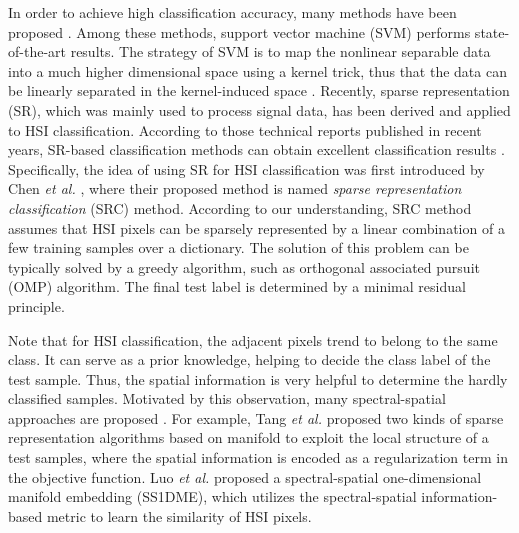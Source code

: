 \documentclass{ws-ijwmip}
\begin{document}
In order to achieve high classification accuracy, many methods have been proposed \cite{6}. 
Among these methods, support vector machine (SVM) performs state-of-the-art results. 
The strategy of SVM is to map the nonlinear separable data into a much higher dimensional space using a kernel trick, thus that the data can be linearly separated in the kernel-induced space \cite{7,8,9}.
Recently, sparse representation (SR), which was mainly used to process signal data, has been derived and applied to  
HSI classification. 
According to those technical reports published in recent years, SR-based classification methods can obtain excellent classification results \cite{13,14,15,16,17}.
Specifically, the idea of using SR for HSI classification was first introduced by Chen {\it et al.} \cite{18}, where their proposed method is named \emph{sparse representation classification} (SRC) method.
According to our understanding, SRC method assumes that HSI pixels can be sparsely represented by a linear combination of a few training samples over a dictionary. 
The solution of this problem can be typically solved by a greedy algorithm, such as orthogonal associated pursuit (OMP) algorithm. 
The final test label is determined by a minimal residual principle.



Note that for HSI classification, the adjacent pixels trend to belong to the same class.
It can serve as a prior knowledge, helping to decide the class label of the test sample.
Thus, the spatial information is very helpful to determine the hardly classified samples.
Motivated by this observation, 
many spectral-spatial approaches are proposed \cite{19}.
For example, 
Tang {\it et al.} \cite{20} proposed two kinds of sparse representation algorithms based on manifold to exploit the local structure of a test samples, where the spatial information is encoded as a regularization term in the objective function.
Luo {\it et al.} \cite{21} proposed a spectral-spatial one-dimensional manifold embedding (SS1DME), which utilizes the spectral-spatial information-based metric to learn the similarity of HSI pixels.
\end{document}
